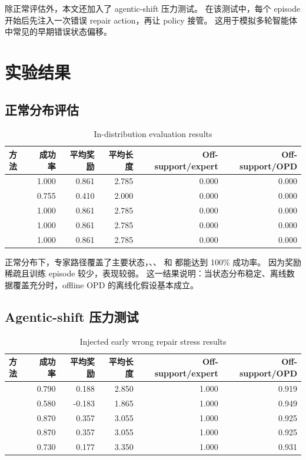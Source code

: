 \documentclass[11pt]{ctexart}
\begin{document}
除正常评估外，本文还加入了 agentic-shift 压力测试。
在该测试中，每个 episode 开始后先注入一次错误 repair action，再让 policy 接管。
这用于模拟多轮智能体中常见的早期错误状态偏移。

\section{实验结果}

\subsection{正常分布评估}

\begin{table}[H]
\centering
\caption{In-distribution evaluation results}
\begin{tabular}{lrrrrr}
\toprule
方法 & 成功率 & 平均奖励 & 平均长度 & Off-support/expert & Off-support/OPD \\
\midrule
\sft{} & 1.000 & 0.861 & 2.785 & 0.000 & 0.000 \\
\onlinerl{} & 0.755 & 0.410 & 2.000 & 0.000 & 0.000 \\
\offlineopd{} & 1.000 & 0.861 & 2.785 & 0.000 & 0.000 \\
\supportopd{} & 1.000 & 0.861 & 2.785 & 0.000 & 0.000 \\
\onlineopd{} & 1.000 & 0.861 & 2.785 & 0.000 & 0.000 \\
\bottomrule
\end{tabular}
\end{table}

正常分布下，专家路径覆盖了主要状态，\sft{}、\offlineopd{}、\supportopd{} 和 \onlineopd{} 都能达到 100\% 成功率。
\onlinerl{} 因为奖励稀疏且训练 episode 较少，表现较弱。
这一结果说明：当状态分布稳定、离线数据覆盖充分时，offline OPD 的离线化假设基本成立。

\subsection{Agentic-shift 压力测试}

\begin{table}[H]
\centering
\caption{Injected early wrong repair stress results}
\begin{tabular}{lrrrrr}
\toprule
方法 & 成功率 & 平均奖励 & 平均长度 & Off-support/expert & Off-support/OPD \\
\midrule
\sft{} & 0.790 & 0.188 & 2.850 & 1.000 & 0.919 \\
\onlinerl{} & 0.580 & -0.183 & 1.865 & 1.000 & 0.949 \\
\offlineopd{} & 0.870 & 0.357 & 3.055 & 1.000 & 0.925 \\
\supportopd{} & 0.870 & 0.357 & 3.055 & 1.000 & 0.925 \\
\onlineopd{} & 0.730 & 0.177 & 3.350 & 1.000 & 0.931 \\
\bottomrule
\end{tabular}
\end{table}
\end{document}
